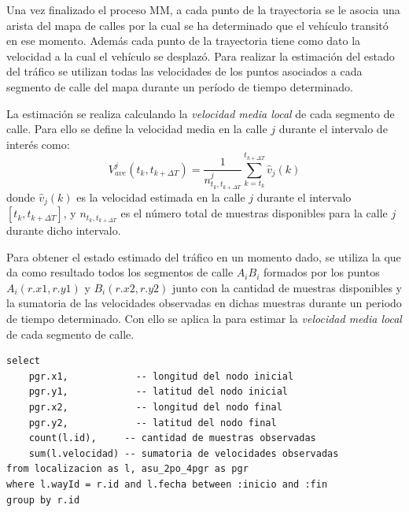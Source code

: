 Una vez finalizado el proceso MM, a cada punto de la trayectoria se le asocia una arista del mapa de calles por la cual se ha determinado que el vehículo transitó en ese momento. Además cada punto de la trayectoria tiene como dato la velocidad a la cual el vehículo se desplazó. Para realizar la estimación del estado del tráfico se utilizan todas las velocidades de los puntos asociados a cada segmento de calle del mapa durante un período de tiempo determinado.

La estimación se realiza calculando la \emph{velocidad media local} de cada segmento de calle. Para ello se define la velocidad media en la calle $j$ durante el intervalo de interés como:
\begin{equation}
\label{eq:velocidad_media}
{ V }_{ ave }^{ j }({ t }_{ k },{ t }_{ k+\Delta T })=\frac { 1 }{ { n }_{ { t }_{ k },{ t }_{ k+\Delta T } }^{ j } } \sum_{ k={ t }_{ k } }^{ { t }_{ k+\Delta T } }{ \hat { { v } } _{ j }(k) }
\end{equation}
donde ${ \hat { { v } } _{ j }(k) }$ es la velocidad estimada en la calle $j$ durante el intervalo $\left[ { t }_{ k },{ t }_{ k+\Delta T } \right] $, y ${ { n }_{ { t }_{ k },{ t }_{ k+\Delta T }}}$ es el número total de muestras disponibles para la calle $j$ durante dicho intervalo.

Para obtener el estado estimado del tráfico en un momento dado, se utiliza la  que da como resultado todos los segmentos de calle $A_iB_i$ formados por los puntos $A_i(r.x1, r.y1)$ y $B_i(r.x2, r.y2)$ junto con la cantidad de muestras disponibles y la sumatoria de las velocidades observadas en dichas muestras durante un periodo de tiempo determinado. Con ello se aplica la  para estimar la \emph{velocidad media local} de cada segmento de calle.

\begin{lstlisting}[float,floatplacement=tbh,caption={Obtención de datos de tráfico}, label={lst:trafico}]
select 
    pgr.x1,            -- longitud del nodo inicial
    pgr.y1,            -- latitud del nodo inicial
    pgr.x2,            -- longitud del nodo final
    pgr.y2,            -- latitud del nodo final
    count(l.id),     -- cantidad de muestras observadas
    sum(l.velocidad) -- sumatoria de velocidades observadas
from localizacion as l, asu_2po_4pgr as pgr
where l.wayId = r.id and l.fecha between :inicio and :fin
group by r.id
\end{lstlisting}

